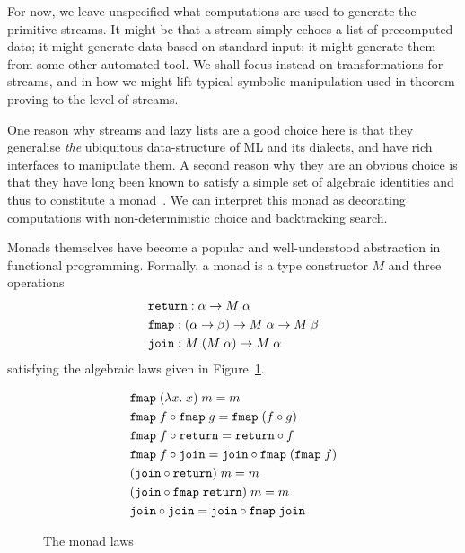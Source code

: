 For now, we leave unspecified what computations are used to generate the primitive streams. It might be that a stream simply echoes a list of precomputed data; it might generate data based on standard input; it might generate them from some other automated tool. We shall focus instead on transformations for streams, and in how we might lift typical symbolic manipulation used in theorem proving to the level of streams.

One reason why streams and lazy lists are a good choice here is that they generalise \emph{the} ubiquitous data-structure of ML and its dialects, and have rich interfaces to manipulate them. A second reason why they are an obvious choice is that they have long been known to satisfy a simple set of algebraic identities and thus to constitute a monad~\cite{MonadWadler}. We can interpret this monad as decorating computations with non-deterministic choice and backtracking search.

Monads themselves have become a popular and well-understood abstraction in functional programming. Formally, a monad is a type constructor $M$ and three operations 
\begin{align*}
&\texttt{return} : \alpha \rightarrow M\;\alpha\\
&\texttt{fmap} : (\alpha \rightarrow \beta) \rightarrow M\;\alpha \rightarrow M\;\beta\\
&\texttt{join} : M\;(M\;\alpha) \rightarrow M\;\alpha
\end{align*}
satisfying the algebraic laws given in Figure~\ref{fig:MonadLaws}.

\begin{figure}
\begin{align}
&\texttt{fmap}\;(\lambda x.\;x)\;m = m\notag\\
&\texttt{fmap}\;f \circ \texttt{fmap}\;g = \texttt{fmap}\;(f \circ g)\notag\\
&\texttt{fmap}\;f \circ \texttt{return} = \texttt{return}\circ f\notag\\
&\texttt{fmap}\;f \circ \texttt{join} = \texttt{join} \circ \texttt{fmap}\;(\texttt{fmap}\;f)\notag\\
&(\texttt{join} \circ \texttt{return})\;m = m\notag\\
&(\texttt{join} \circ \texttt{fmap}\;\texttt{return})\;m = m\notag\\
&\texttt{join} \circ \texttt{join} = \texttt{join} \circ \texttt{fmap}\;\texttt{join} \label{eq:JoinAssoc}
\end{align}
\caption{The monad laws}
\label{fig:MonadLaws}
\end{figure}

